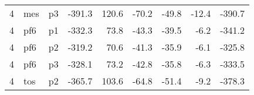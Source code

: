 \documentclass[a4paper]{article}
\begin{document}
\begin{table}[ht]
\begin{tabular}{rllrrrrrr}
   4 & mes & p3 & -391.3 & 120.6 & -70.2 & -49.8 & -12.4 & -390.7 \\ 
   4 & pf6 & p1 & -332.3 & 73.8 & -43.3 & -39.5 & -6.2 & -341.2 \\ 
   4 & pf6 & p2 & -319.2 & 70.6 & -41.3 & -35.9 & -6.1 & -325.8 \\ 
   4 & pf6 & p3 & -328.1 & 73.2 & -42.8 & -35.8 & -6.3 & -333.5 \\ 
   4 & tos & p2 & -365.7 & 103.6 & -64.8 & -51.4 & -9.2 & -378.3 \\ 
   \hline
\end{tabular}
\end{table}
\end{document}
